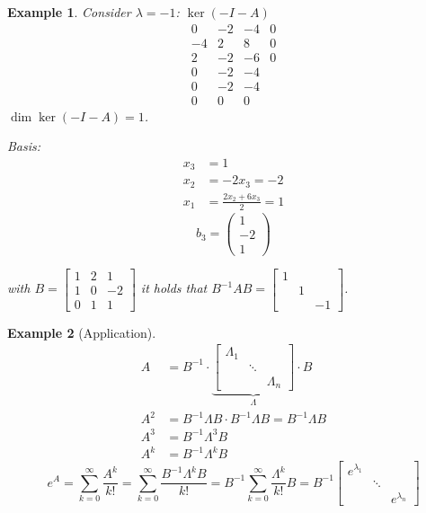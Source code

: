 \documentclass{article}
\newtheorem{example}{Example}  \numberwithin{example}{section}
\begin{document}
\begin{example}
  Consider $\lambda = -1$: $\ker(-I - A)$
  \[
    \begin{array}{ccc|c}
      0 & -2 & -4 & 0 \\
      -4 & 2 & 8 & 0 \\
      2 & -2 & -6 & 0 \\
    \hline
      0 & -2 & -4 \\
      0 & -2 & -4 \\
    \hline
      0 & 0 & 0
    \end{array}
  \]
  $\dim\ker(-I - A) = 1$.

  Basis:
  \begin{align*}
    x_3 &= 1 \\
    x_2 &= -2x_3 = -2 \\
    x_1 &= \frac{2x_2 + 6x_3}{2} = 1
  \end{align*}
  \[ b_3 = \begin{pmatrix} 1 \\ -2 \\ 1 \end{pmatrix} \]

  with $B = \begin{bmatrix} 1 & 2 & 1 \\ 1 & 0 & -2 \\ 0 & 1 & 1 \end{bmatrix}$
  it holds that $B^{-1} AB = \begin{bmatrix} 1 &  & \\ & 1 & \\ & & -1 \end{bmatrix}$.
\end{example}

\begin{example}[Application]
  \begin{align*}
    A &= B^{-1} \cdot \underbrace{\begin{bmatrix} \Lambda_1 & & \\ & \ddots & \\ & & \Lambda_n \end{bmatrix}}_{\Lambda} \cdot B \\
    A^2 &= B^{-1} \Lambda B \cdot B^{-1} \Lambda B = B^{-1} \Lambda B \\
    A^3 &= B^{-1} \Lambda^3 B \\
    A^k &= B^{-1} \Lambda^k B
  \end{align*}
  \[ e^A = \sum_{k=0}^\infty \frac{A^k}{k!} = \sum_{k=0}^\infty \frac{B^{-1} \Lambda^k B}{k!} = B^{-1} \sum_{k=0}^\infty \frac{\Lambda^k}{k!} B = B^{-1} \begin{bmatrix} e^{\lambda_1} & & \\ & \ddots & \\ & & e^{\lambda_n} \end{bmatrix} \]
\end{example}
\end{document}
